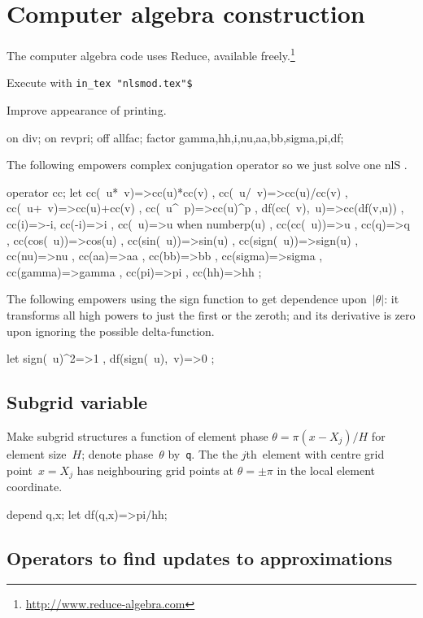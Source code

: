 \documentclass[12pt,a5paper]{article}
\begin{document}
\section{Computer algebra construction}

The computer algebra code uses Reduce, available freely.\footnote{\url{http://www.reduce-algebra.com}}

Execute with \verb|in_tex "nlsmod.tex"$|

Improve appearance of printing.
\begin{reduce}
on div; on revpri; off allfac;
factor gamma,hh,i,nu,aa,bb,sigma,pi,df;
\end{reduce}

The following empowers complex conjugation operator so we just solve one nlS \pde.
\begin{reduce}
operator cc;
let { cc(~u*~v)=>cc(u)*cc(v) 
    , cc(~u/~v)=>cc(u)/cc(v) 
    , cc(~u+~v)=>cc(u)+cc(v) 
    , cc(~u^~p)=>cc(u)^p 
    , df(cc(~v),~u)=>cc(df(v,u))
    , cc(i)=>-i, cc(-i)=>i
    , cc(~u)=>u when numberp(u)
    , cc(cc(~u))=>u
    , cc(q)=>q
    , cc(cos(~u))=>cos(u)
    , cc(sin(~u))=>sin(u)
    , cc(sign(~u))=>sign(u)
    , cc(nu)=>nu
    , cc(aa)=>aa
    , cc(bb)=>bb
    , cc(sigma)=>sigma
    , cc(gamma)=>gamma
    , cc(pi)=>pi
    , cc(hh)=>hh
    };
\end{reduce}

The following empowers using the sign function to get dependence upon~\(|\theta|\): it transforms all high powers to just the first or the zeroth; and its derivative is zero upon ignoring the possible delta-function.
\begin{reduce}
let { sign(~u)^2=>1
    , df(sign(~u),~v)=>0 };
\end{reduce}

\subsection{Subgrid variable}

Make subgrid structures a function of element phase
$\theta=\pi(x-X_j)/H$ for element size~$H$; denote phase~$\theta$
by~\verb|q|.
The the $j$th~element with centre grid point~\(x=X_j\) has neighbouring grid points at $\theta=\pm\pi$ in the local element coordinate.

\begin{reduce}
depend q,x;
let df(q,x)=>pi/hh;
\end{reduce}


\subsection{Operators to find updates to approximations}
\end{document}
